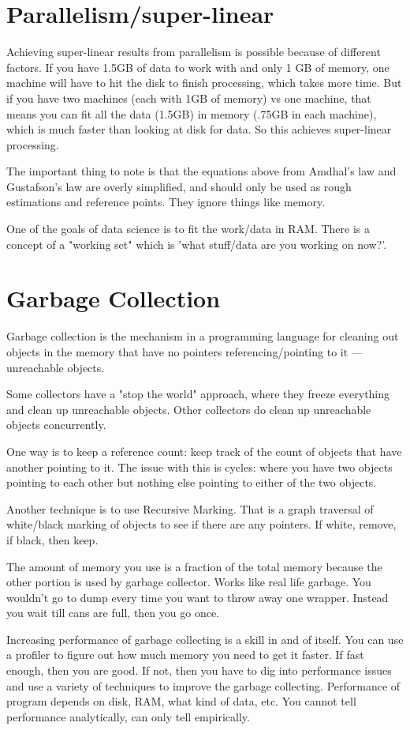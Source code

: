 \documentclass[twoside]{article}
\begin{document}
\section{Parallelism/super-linear}

Achieving super-linear results from parallelism is possible because of different factors. If you have 1.5GB of data to work with and only 1 GB of memory, one machine will have to hit the disk to finish processing, which takes more time. But if you have two machines (each with 1GB of memory) vs one machine, that means you can fit all the data (1.5GB) in memory (.75GB in each machine), which is much faster than looking at disk for data. So this achieves super-linear processing. 

The important thing to note is that the equations above from Amdhal's law and Gustafson's law are overly simplified, and should only be used as rough estimations and reference points. They ignore things like memory.

One of the goals of data science is to fit the work/data in RAM. There is a concept of a "working set" which is 'what stuff/data are you working on now?'.


\section{Garbage Collection}

Garbage collection is the mechanism in a programming language for cleaning out objects in the memory that have no pointers referencing/pointing to it — unreachable objects.

Some collectors have a "stop the world" approach, where they freeze everything and clean up unreachable objects. Other collectors do clean up unreachable objects concurrently. 

One way is to keep a reference count: keep track of the count of objects that have another pointing to it. The issue with this is cycles: where you have two objects pointing to each other but nothing else pointing to either of the two objects.


Another technique is to use Recursive Marking. That is a graph traversal of white/black marking of objects to see if there are any pointers. If white, remove, if black, then keep.

The amount of memory you use is a fraction of the total memory because the other
portion is used by garbage collector. Works like real life garbage.  You
wouldn’t go to dump every time you want to throw away one wrapper. Instead you wait till cans are full, then you go once.

Increasing performance of garbage collecting is a skill in and of itself. You can use a profiler to figure out how much memory you need to get it faster. If fast enough, then you are good. If not, then you have to dig into performance issues and use a variety of techniques to improve the garbage collecting. Performance of program depends on disk, RAM, what kind of data, etc. You cannot tell performance analytically, can only tell empirically.




\end{document}
